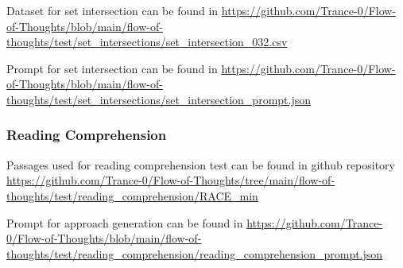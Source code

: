 \documentclass{article}
\begin{document}
Dataset for set intersection can be found in \url{https://github.com/Trance-0/Flow-of-Thoughts/blob/main/flow-of-thoughts/test/set_intersections/set_intersection_032.csv}

Prompt for set intersection can be found in \url{https://github.com/Trance-0/Flow-of-Thoughts/blob/main/flow-of-thoughts/test/set_intersections/set_intersection_prompt.json}

\subsubsection{Reading Comprehension}
\label{sec:appendix_reading_comprehension}
Passages used for reading comprehension test can be found in github repository \url{https://github.com/Trance-0/Flow-of-Thoughts/tree/main/flow-of-thoughts/test/reading_comprehension/RACE_min}

Prompt for approach generation can be found in \url{https://github.com/Trance-0/Flow-of-Thoughts/blob/main/flow-of-thoughts/test/reading_comprehension/reading_comprehension_prompt.json}
\end{document}
